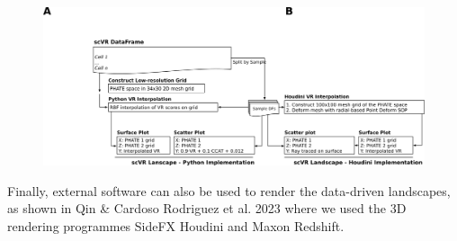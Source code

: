 \begin{figure}
    \centering
    \includegraphics{02methods/figs/2VR_Landscape.png}
    \caption{}
    \label{}
\end{figure}

Finally, external software can also be used to render the data-driven landscapes, as shown in Qin \& Cardoso Rodriguez et al. 2023 where we used the 3D rendering programmes SideFX Houdini and Maxon Redshift.







